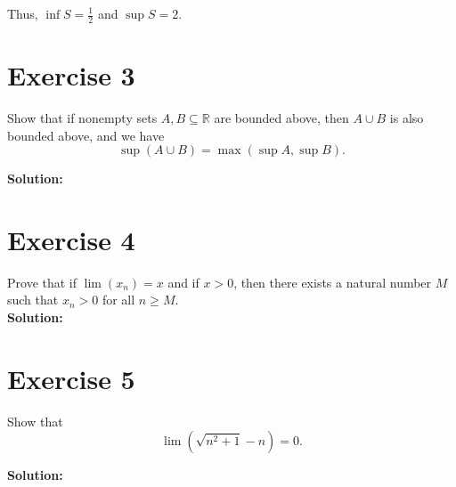 \documentclass{article}
\begin{document}
Thus, $\inf S = \frac{1}{2}$ and $\sup S = 2$.
\newpage

\section*{Exercise 3}
Show that if nonempty sets $A, B \subseteq \mathbb{R}$ are bounded above, then $A \cup B$ is also bounded above, and we have
\[\sup(A \cup B) = \max(\sup A, \sup B).\]

\textbf{Solution:} \\



\newpage

\section*{Exercise 4}
Prove that if $\lim(x_n) = x$ and if $x > 0$, then there exists a natural number $M$ such that $x_n > 0$ for all $n \geq M$. \\

\textbf{Solution:} \\



\newpage

\section*{Exercise 5}
Show that
\[\lim\left(\sqrt{n^2 + 1} - n\right) = 0.\]

\textbf{Solution:} \\
\end{document}
